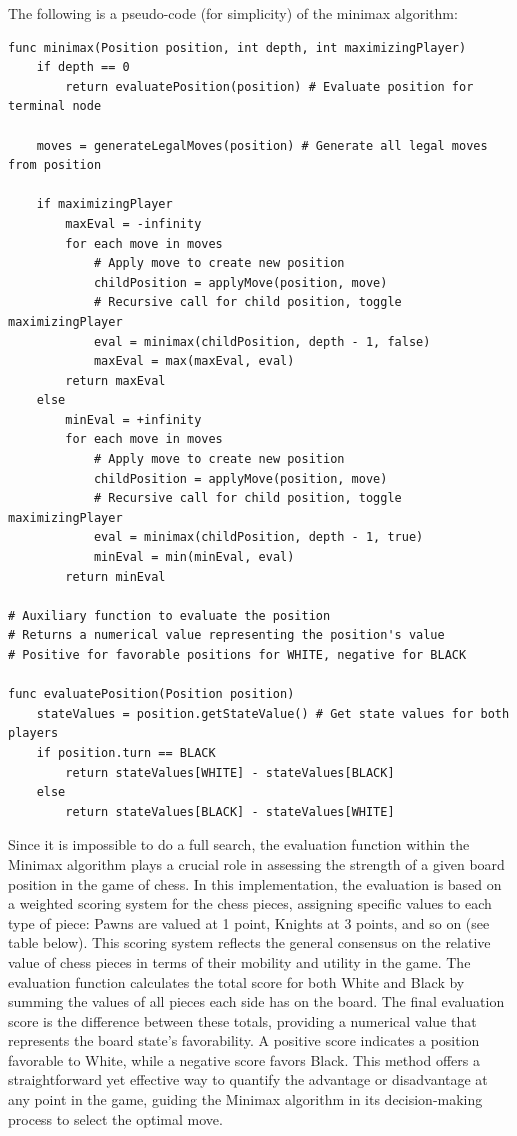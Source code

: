 \documentclass{article}
\begin{document}
The following is a pseudo-code (for simplicity) of the minimax algorithm:

\begin{lstlisting}[caption={Pseudo-Code of the minimax used}, label=lst:pseudocode]
func minimax(Position position, int depth, int maximizingPlayer)
    if depth == 0
        return evaluatePosition(position) # Evaluate position for terminal node

    moves = generateLegalMoves(position) # Generate all legal moves from position

    if maximizingPlayer
        maxEval = -infinity
        for each move in moves
            # Apply move to create new position
            childPosition = applyMove(position, move)
            # Recursive call for child position, toggle maximizingPlayer
            eval = minimax(childPosition, depth - 1, false)
            maxEval = max(maxEval, eval)
        return maxEval
    else
        minEval = +infinity
        for each move in moves
            # Apply move to create new position
            childPosition = applyMove(position, move)
            # Recursive call for child position, toggle maximizingPlayer
            eval = minimax(childPosition, depth - 1, true)
            minEval = min(minEval, eval)
        return minEval

# Auxiliary function to evaluate the position
# Returns a numerical value representing the position's value
# Positive for favorable positions for WHITE, negative for BLACK

func evaluatePosition(Position position)
    stateValues = position.getStateValue() # Get state values for both players
    if position.turn == BLACK
        return stateValues[WHITE] - stateValues[BLACK]
    else
        return stateValues[BLACK] - stateValues[WHITE]

\end{lstlisting}

Since it is impossible to do a full search, the evaluation function within the Minimax algorithm plays a crucial role in assessing the strength of a given board position in the game of chess. In this implementation, the evaluation is based on a weighted scoring system for the chess pieces, assigning specific values to each type of piece: Pawns are valued at 1 point, Knights at 3 points, and so on (see table below). This scoring system reflects the general consensus on the relative value of chess pieces in terms of their mobility and utility in the game. The evaluation function calculates the total score for both White and Black by summing the values of all pieces each side has on the board. The final evaluation score is the difference between these totals, providing a numerical value that represents the board state's favorability. A positive score indicates a position favorable to White, while a negative score favors Black. This method offers a straightforward yet effective way to quantify the advantage or disadvantage at any point in the game, guiding the Minimax algorithm in its decision-making process to select the optimal move.
\end{document}
